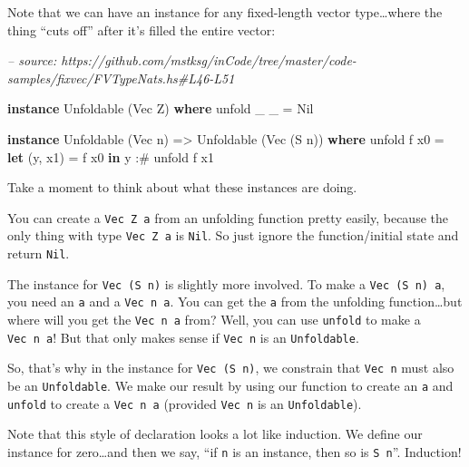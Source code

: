\documentclass[]{article}
\newenvironment{Shaded}{}{}
\newcommand{\CommentTok}[1]{\textcolor[rgb]{0.38,0.63,0.69}{\textit{#1}}}
\newcommand{\DataTypeTok}[1]{\textcolor[rgb]{0.56,0.13,0.00}{#1}}
\newcommand{\FunctionTok}[1]{\textcolor[rgb]{0.02,0.16,0.49}{#1}}
\newcommand{\KeywordTok}[1]{\textcolor[rgb]{0.00,0.44,0.13}{\textbf{#1}}}
\newcommand{\NormalTok}[1]{#1}
\newcommand{\OtherTok}[1]{\textcolor[rgb]{0.00,0.44,0.13}{#1}}
\begin{document}
Note that we can have an instance for any fixed-length vector type\ldots{}where
the thing ``cuts off'' after it's filled the entire vector:

\begin{Shaded}
\begin{Highlighting}[]
\CommentTok{-- source: https://github.com/mstksg/inCode/tree/master/code-samples/fixvec/FVTypeNats.hs#L46-L51}

\KeywordTok{instance} \DataTypeTok{Unfoldable}\NormalTok{ (}\DataTypeTok{Vec} \DataTypeTok{Z}\NormalTok{) }\KeywordTok{where}
\NormalTok{    unfold _ _ }\FunctionTok{=} \DataTypeTok{Nil}

\KeywordTok{instance} \DataTypeTok{Unfoldable}\NormalTok{ (}\DataTypeTok{Vec}\NormalTok{ n) }\OtherTok{=>} \DataTypeTok{Unfoldable}\NormalTok{ (}\DataTypeTok{Vec}\NormalTok{ (}\DataTypeTok{S}\NormalTok{ n)) }\KeywordTok{where}
\NormalTok{    unfold f x0 }\FunctionTok{=} \KeywordTok{let}\NormalTok{ (y, x1) }\FunctionTok{=}\NormalTok{ f x0}
                  \KeywordTok{in}\NormalTok{  y }\FunctionTok{:#}\NormalTok{ unfold f x1}
\end{Highlighting}
\end{Shaded}

Take a moment to think about what these instances are doing.

You can create a \texttt{Vec\ Z\ a} from an unfolding function pretty easily,
because the only thing with type \texttt{Vec\ Z\ a} is \texttt{Nil}. So just
ignore the function/initial state and return \texttt{Nil}.

The instance for \texttt{Vec\ (S\ n)} is slightly more involved. To make a
\texttt{Vec\ (S\ n)\ a}, you need an \texttt{a} and a \texttt{Vec\ n\ a}. You
can get the \texttt{a} from the unfolding function\ldots{}but where will you get
the \texttt{Vec\ n\ a} from? Well, you can use \texttt{unfold} to make a
\texttt{Vec\ n\ a}! But that only makes sense if \texttt{Vec\ n} is an
\texttt{Unfoldable}.

So, that's why in the instance for \texttt{Vec\ (S\ n)}, we constrain that
\texttt{Vec\ n} must also be an \texttt{Unfoldable}. We make our result by using
our function to create an \texttt{a} and \texttt{unfold} to create a
\texttt{Vec\ n\ a} (provided \texttt{Vec\ n} is an \texttt{Unfoldable}).

Note that this style of declaration looks a lot like induction. We define our
instance for zero\ldots{}and then we say, ``if \texttt{n} is an instance, then
so is \texttt{S\ n}''. Induction!
\end{document}
